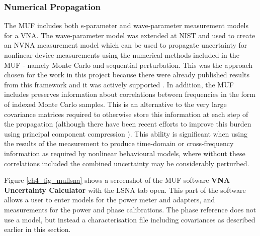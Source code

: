 \documentclass[../thesis/thesis.tex]{subfiles}
\begin{document}
\subsubsection{Numerical Propagation}

The MUF includes both s-parameter and wave-parameter measurement models for a VNA. The wave-parameter model was extended at NIST and used to create an NVNA measurement model which can be used to propagate uncertainty for nonlinear device measurements using the numerical methods included in the MUF - namely Monte Carlo and sequential perturbation. This was the approach chosen for the work in this project because there were already published results from this framework and it was actively supported \cite{Avolio_2015}. In addition, the MUF includes preserves information about correlations between frequencies in the form of indexed Monte Carlo samples. This is an alternative to the very large covariance matrices required to otherwise store this information at each step of the propagation (although there have been recent efforts to improve this burden using principal component compression \cite{Humphreys_2015}). This ability is significant when using the results of the measurement to produce time-domain or cross-frequency information as required by nonlinear behavioural models, where without these correlations included the combined uncertainty may be considerably perturbed.

Figure \ref{ch4_fig_muflsna} shows a screenshot of the MUF software \textbf{VNA Uncertainty Calculator} with the LSNA tab open. This part of the software allows a user to enter models for the power meter and adapters, and measurements for the power and phase calibrations. The phase reference does not use a model, but instead a characterisation file including covariances as described earlier in this section.
\end{document}
